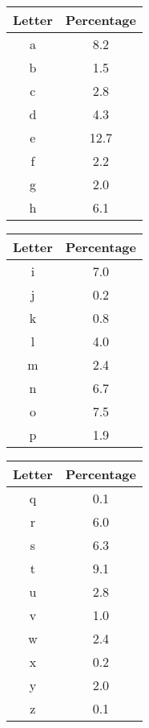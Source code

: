 \documentclass[12pt]{article}
\begin{document}
\begin{center}
	\begin{multicols}{3}
		\begin{tabular}{||c | c||}
			\hline
			Letter & Percentage \\
			\hline\hline
			a & 8.2 \\ 
			\hline
			b & 1.5 \\
			\hline
			c & 2.8 \\
			\hline
			d & 4.3 \\
			\hline
			e & 12.7 \\
			\hline
			f & 2.2 \\
			\hline
			g & 2.0 \\
			\hline
			h & 6.1 \\
			\hline
		\end{tabular}
	
		\columnbreak
		
		\begin{tabular}{||c | c||}
			\hline
			Letter & Percentage \\
			\hline\hline
			i & 7.0 \\
			\hline
			j & 0.2 \\
			\hline
			k & 0.8 \\
			\hline
			l & 4.0 \\
			\hline
			m & 2.4 \\
			\hline
			n & 6.7 \\
			\hline
			o & 7.5 \\
			\hline
			p & 1.9 \\
			\hline
		\end{tabular}
	
	\columnbreak
	
		\begin{tabular}{||c | c||}
			\hline
			Letter & Percentage \\
			\hline\hline
			q & 0.1 \\
			\hline
			r & 6.0 \\
			\hline 
			s & 6.3 \\ 
			\hline 
			t & 9.1 \\
			\hline 
			u & 2.8 \\
			\hline 
			v & 1.0 \\
			\hline 
			w & 2.4 \\
			\hline
			x & 0.2 \\
			\hline
			y & 2.0 \\
			\hline 
			z & 0.1 \\
			\hline 
		\end{tabular}
	\end{multicols}
\end{center}
\cite[pg. 19]{codebook}
\end{document}
